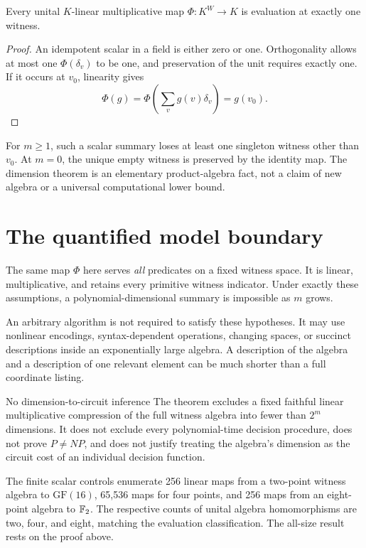 \begin{corollary}\label{c:cor:scalar-eval}
Every unital $K$-linear multiplicative map $\Phi:K^W\to K$ is evaluation at exactly one witness.
\end{corollary}
\begin{proof}
An idempotent scalar in a field is either zero or one. Orthogonality allows at most one $\Phi(\delta_v)$ to be one, and preservation of the unit requires exactly one. If it occurs at $v_0$, linearity gives
\[
 \Phi(g)=\Phi\left(\sum_v g(v)\delta_v\right)=g(v_0).
\]
\end{proof}
For $m\ge1$, such a scalar summary loses at least one singleton witness other than $v_0$. At $m=0$, the unique empty witness is preserved by the identity map. The dimension theorem is an elementary product-algebra fact, not a claim of new algebra or a universal computational lower bound.

\section{The quantified model boundary}
The same map $\Phi$ here serves \emph{all} predicates on a fixed witness space. It is linear, multiplicative, and retains every primitive witness indicator. Under exactly these assumptions, a polynomial-dimensional summary is impossible as $m$ grows.

An arbitrary algorithm is not required to satisfy these hypotheses. It may use nonlinear encodings, syntax-dependent operations, changing spaces, or succinct descriptions inside an exponentially large algebra. A description of the algebra and a description of one relevant element can be much shorter than a full coordinate listing.

\begin{circuitscopebox}{No dimension-to-circuit inference}
The theorem excludes a fixed faithful linear multiplicative compression of the full witness algebra into fewer than $2^m$ dimensions. It does not exclude every polynomial-time decision procedure, does not prove $P\ne NP$, and does not justify treating the algebra's dimension as the circuit cost of an individual decision function.
\end{circuitscopebox}

The finite scalar controls enumerate 256 linear maps from a two-point witness algebra to $\mathrm{GF}(16)$, 65,536 maps for four points, and 256 maps from an eight-point algebra to $\mathbb F_2$. The respective counts of unital algebra homomorphisms are two, four, and eight, matching the evaluation classification. The all-size result rests on the proof above.

